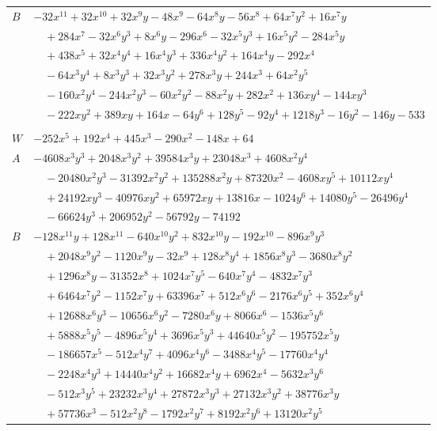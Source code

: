 \documentclass[11pt]{article}
\begin{document}
\begin{longtable}{@{}ll@{}}
$B$ & $-32x^{11}+32x^{10}+32x^{9}y-48x^{9}-64x^{8}y-56x^{8}+64x^{7}y^{2}+16x^{7}y$\\
 & $\quad +284x^{7}-32x^{6}y^{3}+8x^{6}y-296x^{6}-32x^{5}y^{3}+16x^{5}y^{2}-284x^{5}y$\\
 & $\quad +438x^{5}+32x^{4}y^{4}+16x^{4}y^{3}+336x^{4}y^{2}+164x^{4}y-292x^{4}$\\
 & $\quad -64x^{3}y^{4}+8x^{3}y^{3}+32x^{3}y^{2}+278x^{3}y+244x^{3}+64x^{2}y^{5}$\\
 & $\quad -160x^{2}y^{4}-244x^{2}y^{3}-60x^{2}y^{2}-88x^{2}y+282x^{2}+136xy^{4}-144xy^{3}$\\
 & $\quad -222xy^{2}+389xy+164x-64y^{6}+128y^{5}-92y^{4}+1218y^{3}-16y^{2}-146y-533$\\
\addlinespace[3pt]
\multicolumn{2}{@{}l}{$i=34$, $m=1$, neighbours $3,4,8,9,11,12,26,31,39,40$}\\
$W$ & $-252x^{5}+192x^{4}+445x^{3}-290x^{2}-148x+64$\\
$A$ & $-4608x^{3}y^{3}+2048x^{3}y^{2}+39584x^{3}y+23048x^{3}+4608x^{2}y^{4}$\\
 & $\quad -20480x^{2}y^{3}-31392x^{2}y^{2}+135288x^{2}y+87320x^{2}-4608xy^{5}+10112xy^{4}$\\
 & $\quad +24192xy^{3}-40976xy^{2}+65972xy+13816x-1024y^{6}+14080y^{5}-26496y^{4}$\\
 & $\quad -66624y^{3}+206952y^{2}-56792y-74192$\\
$B$ & $-128x^{11}y+128x^{11}-640x^{10}y^{2}+832x^{10}y-192x^{10}-896x^{9}y^{3}$\\
 & $\quad +2048x^{9}y^{2}-1120x^{9}y-32x^{9}+128x^{8}y^{4}+1856x^{8}y^{3}-3680x^{8}y^{2}$\\
 & $\quad +1296x^{8}y-31352x^{8}+1024x^{7}y^{5}-640x^{7}y^{4}-4832x^{7}y^{3}$\\
 & $\quad +6464x^{7}y^{2}-1152x^{7}y+63396x^{7}+512x^{6}y^{6}-2176x^{6}y^{5}+352x^{6}y^{4}$\\
 & $\quad +12688x^{6}y^{3}-10656x^{6}y^{2}-7280x^{6}y+8066x^{6}-1536x^{5}y^{6}$\\
 & $\quad +5888x^{5}y^{5}-4896x^{5}y^{4}+3696x^{5}y^{3}+44640x^{5}y^{2}-195752x^{5}y$\\
 & $\quad -186657x^{5}-512x^{4}y^{7}+4096x^{4}y^{6}-3488x^{4}y^{5}-17760x^{4}y^{4}$\\
 & $\quad -2248x^{4}y^{3}+14440x^{4}y^{2}+16682x^{4}y+6962x^{4}-5632x^{3}y^{6}$\\
 & $\quad -512x^{3}y^{5}+23232x^{3}y^{4}+27872x^{3}y^{3}+27132x^{3}y^{2}+38776x^{3}y$\\
 & $\quad +57736x^{3}-512x^{2}y^{8}-1792x^{2}y^{7}+8192x^{2}y^{6}+13120x^{2}y^{5}$\\

\end{longtable}
\end{document}
